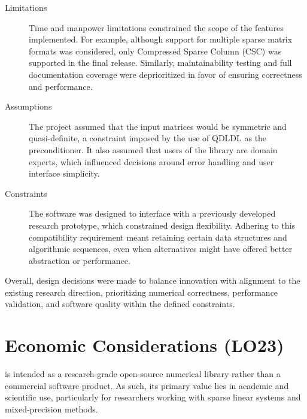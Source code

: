 \documentclass{article}
\begin{document}
\begin{description}
\item[Limitations] Time and manpower limitations constrained the scope of
  the features implemented. For example, although support for multiple sparse
  matrix formats was considered, only Compressed Sparse Column (CSC) was
  supported in the final release. Similarly, maintainability testing and full
  documentation coverage were deprioritized in favor of ensuring correctness and
  performance.
\item[Assumptions] The project assumed that the input matrices would be
  symmetric and quasi-definite, a constraint imposed by the use of QDLDL as the
  preconditioner. It also assumed that users of the library are domain experts,
  which influenced decisions around error handling and user interface
  simplicity.
\item[Constraints] The software was designed to interface with a previously
  developed research prototype, which constrained design flexibility. Adhering
  to this compatibility requirement meant retaining certain data structures and
  algorithmic sequences, even when alternatives might have offered better
  abstraction or performance.
\end{description}

Overall, design decisions were made to balance innovation with alignment to the
existing research direction, prioritizing numerical correctness, performance
validation, and software quality within the defined constraints.

\section{Economic Considerations (LO23)}


\progname{} is intended as a research-grade open-source numerical library rather
than a commercial software product. As such, its primary value lies in academic
and scientific use, particularly for researchers working with sparse linear
systems and mixed-precision methods.
\end{document}
